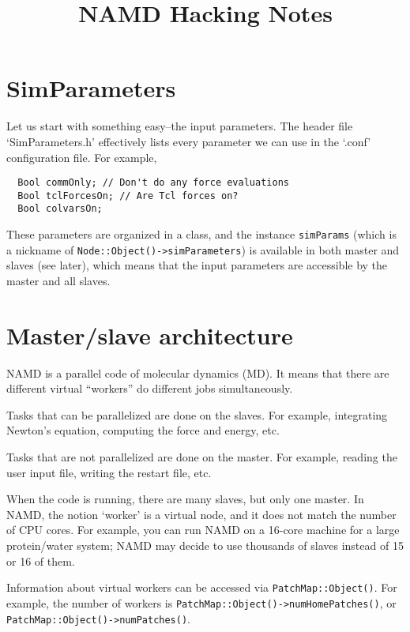 \documentclass{article}
\begin{document}
\title{NAMD Hacking Notes}
\author{ \vspace{-10ex} }
\date{ \vspace{-10ex} }


\maketitle

\tableofcontents


\section{SimParameters}

Let us start with something easy--the input parameters.
%
The header file `SimParameters.h' effectively
lists every parameter we can use in the `.conf' configuration file.
%
For example,
\begin{lstlisting}
  Bool commOnly; // Don't do any force evaluations
  Bool tclForcesOn; // Are Tcl forces on?
  Bool colvarsOn;
\end{lstlisting}
%
These parameters are organized in a class,
and the instance \texttt{simParams}
(which is a nickname of \texttt{Node::Object()->simParameters})
is available in both master and slaves (see later),
which means that the input parameters are accessible
by the master and all slaves.


\section{Master/slave architecture}

NAMD is a parallel code of molecular dynamics (MD).
%
It means that there are different virtual ``workers''
do different jobs simultaneously.

Tasks that can be parallelized are done on the slaves.
%
For example, integrating Newton's equation, computing the force and energy, etc.

Tasks that are not parallelized are done on the master.
%
For example, reading the user input file,
writing the restart file, etc.

When the code is running, there are many slaves,
but only one master.
%
In NAMD, the notion `worker' is a virtual node,
and it does not match the number of CPU cores.
%
For example, you can run NAMD on a 16-core machine
for a large protein/water system;
NAMD may decide to use thousands of slaves
instead of 15 or 16 of them.

Information about virtual workers can be
accessed via \texttt{PatchMap::Object()}.
%
For example, the number of workers is
\texttt{PatchMap::Object()->numHomePatches()},
or \texttt{PatchMap::Object()->numPatches()}.
\end{document}
